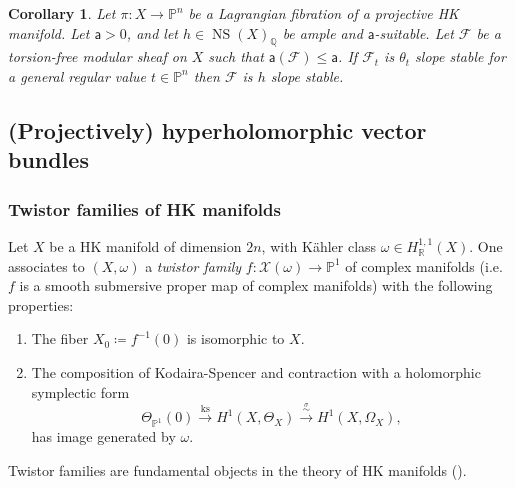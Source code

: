 \documentclass[11pt]{amsart}
\newcommand{\PP}{{\mathbb P}}
\newcommand{\QQ}{{\mathbb Q}}
\newcommand{\RR}{{\mathbb R}}
\let\mathcal\mathscr
\def\cF{\mathcal{F}}
\def\cX{\mathcal{X}}
\DeclareMathOperator{\ks}{ks}
\DeclareMathOperator{\NS}{NS}
\def\lra{\longrightarrow}
\newtheorem{crl}[lmm]{Corollary}
\theoremstyle{definition}
\theoremstyle{remark}
\begin{document}
%
%
\begin{crl}\label{crl:lagstab}
%
Let $\pi\colon X\to\PP^n$ be a  Lagrangian fibration of a  projective HK manifold. Let ${\mathsf a}>0$, and let
 $h\in\NS(X)_{\QQ}$ 
 be ample and ${\mathsf a}$-suitable. Let  $\cF$ be  a torsion-free  modular sheaf  on $X$ such that 
 ${\mathsf a}(\cF)\le {\mathsf a}$.  
If $\cF_t$ is  $\theta_t$ slope stable for a general regular value  $t\in\PP^n$
then  $\cF$ is $h$ slope stable. 
%
\end{crl}
%






%
\subsection{(Projectively) hyperholomorphic vector bundles}\label{subsec:fibrativerb}
%
%
\setcounter{equation}{0}
%
%
\subsubsection{Twistor families of HK manifolds}
%
Let $X$ be a HK manifold of dimension $2n$, with K\"ahler class  $\omega\in H^{1,1}_{\RR}(X)$. One associates to  $(X,\omega)$ a \emph{twistor family} $f\colon \cX(\omega)\to\PP^1$ of complex manifolds (i.e.~$f$ is a smooth submersive proper map of complex manifolds) with the following properties: 
%
\begin{enumerate}
%
\item[(a)]
%
The fiber $X_0\coloneqq f^{-1}(0)$ is isomorphic to $X$.
%
\item[(b)]
%
The composition  of Kodaira-Spencer and contraction with a holomorphic symplectic form
%
\begin{equation}
%
\Theta_{\PP^1}(0)\xrightarrow{\ks} H^1(X,\Theta_X)\overset{\overset{\sigma}{\sim}}{\lra} H^1(X,\Omega_X),
%
\end{equation}
%
 has image generated by $\omega$.
%
\end{enumerate}
%
Twistor families are fundamental objects in the theory of HK manifolds (\cite{huy:hkbasic,huy:hkbasicerratum,huy:conokahler,huy:globtor,verb:globtor}). 
%
\end{document}
